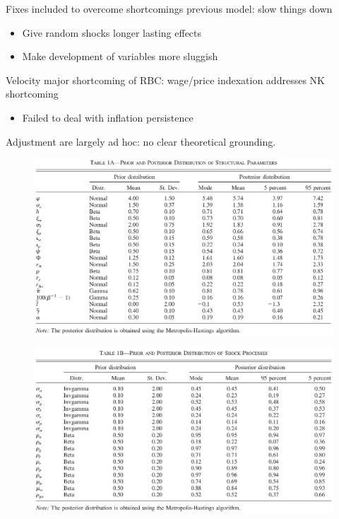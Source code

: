 \documentclass{beamer}
\begin{document}
\begin{frame}
  Fixes included to overcome shortcomings previous model: slow things down
  \begin{itemize}
    \item Give random shocks longer lasting effects
    \item Make development of variables more sluggish
  \end{itemize}
  \medskip
  Velocity major shortcoming of RBC: wage/price indexation addresses NK shortcoming
  \begin{itemize}
    \item Failed to deal with inflation persistence
  \end{itemize}
  \medskip
  Adjustment are largely ad hoc: no clear theoretical grounding.
\end{frame}

\begin{frame}
  \begin{figure}
     \includegraphics[scale=.7]{sw_table1.eps}
   \end{figure} 
\end{frame}

\begin{frame}
  \begin{figure}
    \includegraphics[scale=.7]{sw_table1b.eps}
  \end{figure}
\end{frame}
\end{document}
